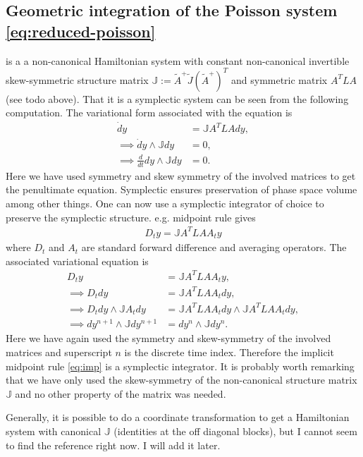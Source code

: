 \documentclass[12pt]{article}
\begin{document}
\subsection{Geometric integration of the Poisson system \eqref{eq:reduced-poisson} }
 is a a non-canonical Hamiltonian system with constant non-canonical invertible skew-symmetric structure matrix $\mathbb{J} := \tilde A ^+ \tilde J (\tilde A ^+)^T$ and symmetric matrix $A^T L A$ (see todo above). That it is a symplectic system can be seen from the following computation. The variational form associated with the equation is
\begin{align*}
\dot dy &= \mathbb{J} A^T L A dy, \\
\implies \dot dy \wedge \mathbb{J}dy &= 0, \\
\implies \frac{d}{dt} dy \wedge \mathbb{J}dy &= 0.
\end{align*}
Here we have used symmetry and skew symmetry of the involved matrices to get the penultimate equation. Symplectic ensures preservation of phase space volume among other things. One can now use a symplectic integrator of choice to preserve the symplectic structure. e.g. midpoint rule gives
\begin{align} \label{eq:imp}
D_t y = \mathbb{J} A^T L A A_t y
\end{align}
where $D_t$ and $A_t$ are standard forward difference and averaging operators. The associated variational equation is
\begin{align*}
D_t y &= \mathbb{J} A^T L A A_t y,\\
\implies D_t dy &= \mathbb{J} A^T L A A_t dy, \\
\implies D_t dy \wedge \mathbb{J} A_t dy &= \mathbb{J} A^T L A A_t dy \wedge \mathbb{J} A^T L A A_t dy, \\
\implies dy^{n+1} \wedge \mathbb{J} dy^{n+1} &= dy^{n} \wedge \mathbb{J} dy^{n}.
\end{align*}
Here we have again used the symmetry and skew-symmetry of the involved matrices and superscript $n$ is the discrete time index. Therefore the implicit midpoint rule \eqref{eq:imp} is a symplectic integrator. It is probably worth remarking that we have only used the skew-symmetry of the non-canonical structure matrix $\mathbb{J}$ and no other property of the matrix was needed.

Generally, it is possible to do a coordinate transformation to get a Hamiltonian system with canonical $\mathbb{J}$ (identities at the off diagonal blocks), but I cannot seem to find the reference right now. I will add it later.



\end{document}
